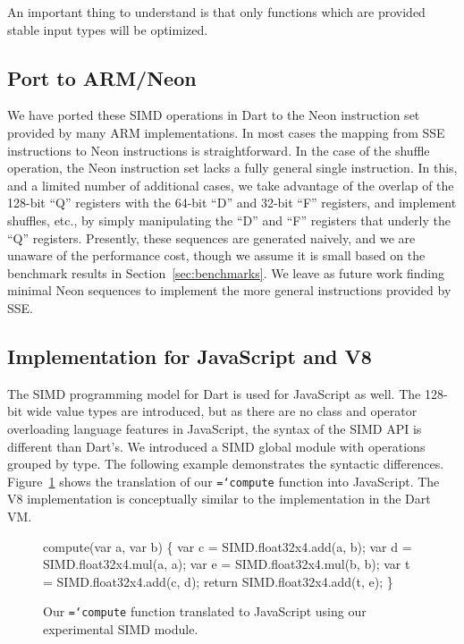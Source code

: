 \documentclass[preprint]{sigplanconf}
\newcommand{\ttt}[1]{{\texttt{\hyphenchar\font=`\-\relax #1}}}%
\begin{document}
An important thing to understand is that only functions which are provided
stable input types will be optimized.

\subsection{Port to ARM/Neon}

We have ported these SIMD operations in Dart to the Neon instruction set
provided by many ARM implementations.
%
In most cases the mapping from SSE instructions to Neon instructions is
straightforward.
%
In the case of the shuffle operation, the Neon instruction set lacks a fully
general single instruction.
%
In this, and a limited number of additional cases, we take advantage of the
overlap of the 128-bit ``Q'' registers with the 64-bit ``D'' and 32-bit ``F''
registers, and implement shuffles, etc., by simply manipulating the ``D'' and
``F'' registers that underly the ``Q'' registers.
%
Presently, these sequences are generated naively, and we are unaware of the
performance cost, though we assume it is small based on the benchmark results
in Section~\ref{sec:benchmarks}.
%
We leave as future work finding minimal Neon sequences to implement the more
general instructions provided by SSE.

\subsection{Implementation for JavaScript and V8}
\label{V8}

The SIMD programming model for Dart is used for JavaScript as well. The 128-bit
wide value types are introduced, but as there are no class and operator
overloading language features in JavaScript, the syntax of the SIMD API is
different than Dart's. We introduced a SIMD global module with operations
grouped by type. The following example demonstrates the syntactic differences.
Figure~\ref{fig:jssimd} shows the translation of our \ttt{compute} function
into JavaScript. The V8 implementation is conceptually similar to the
implementation in the Dart VM.

\begin{figure}
\begin{small}
\begin{program}[style=tt, number=true]
co\tab{}mpute(var a, var b) \{
  var c = SIMD.float32x4.add(a, b);
  var d = SIMD.float32x4.mul(a, a);
  var e = SIMD.float32x4.mul(b, b);
  var t = SIMD.float32x4.add(c, d);
  return SIMD.float32x4.add(t, e);\untab{}
\}
\end{program}
\end{small}
\caption{Our \ttt{compute} function translated to JavaScript using our
experimental SIMD module.}
\label{fig:jssimd}
\end{figure}
\end{document}
